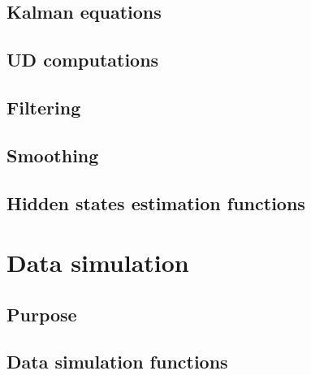\documentclass{article}
\begin{document}
\subsection{Kalman equations}
\subsection{UD computations}
\subsection{Filtering}
\subsection{Smoothing}
\subsection{Hidden states estimation functions}
\newpage

\section{Data simulation}
\subsection{Purpose}
\subsection{Data simulation functions}
\newpage

\end{document}
